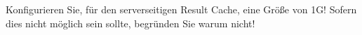     \item Konfigurieren Sie, für den serverseitigen Result Cache, eine
    Größe von 1G! Sofern dies nicht möglich sein sollte, begründen Sie
    warum nicht!
